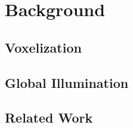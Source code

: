 \chapter{Background}

\section{Voxelization}

\section{Global Illumination}

\section{Related Work}

